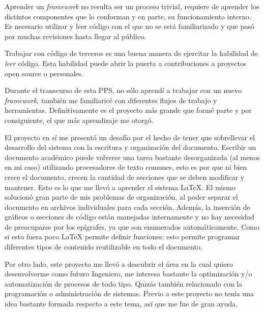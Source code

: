 Aprender un \textit{framework} no resulta ser un proceso trivial, requiere de aprender los
distintos componentes que lo conforman y en parte, su funcionamiento interno\@. Es necesario
utilizar y leer código con el que no se está familiarizado y que pasó por muchas revisiones
hasta llegar al público.

Trabajar con código de terceros es una buena manera de ejercitar la habilidad de \textit{leer}
código\@. Esta habilidad puede abrir la puerta a contribuciones a proyectos open source o
personales.

Durante el transcurso de esta PPS, no sólo aprendí a trabajar con un nuevo \textit{framework},
también me familiaricé con diferentes flujos de trabajo y herramientas\@. Definitivamente es
el proyecto más grande que formé parte y por consiguiente, el que más aprendizaje me otorgó.

El proyecto en sí me presentó un desafío por el hecho de tener que sobrellevar el desarrollo
del sistema con la escritura y organización del documento\@. Escribir un documento académico
puede volverse una tarea bastante desorganizada (al menos en mi caso) utilizando procesadores
de texto comunes, esto es por que ni bien crece el documento, crecen la cantidad de secciones
que se deben modificar y mantener\@. Esto es lo que me llevó a aprender el sistema {\LaTeX}\@.
El mismo solucionó gran parte de mis problemas de organización, al poder
separar el documento en archivos individuales para cada sección\@. Además, la inserción de
gráficos o secciones de código están manejadas internamente y no hay necesidad de
preocuparse por los
epígrafes, ya que son enumerados automáticamente\@. Como si esto fuera poco {\LaTeX} permite
definir funciones: esto permite programar diferentes tipos de contenido reutilizable en todo el
documento.


Por otro lado, este proyecto me llevó a descubrir el área en la cual quiero desenvolverme como
futuro Ingeniero, me interesa bastante la optimización y/o automatización de procesos de todo
tipo. Quizás también relacionado con la programación o administración de sistemas\@. Previo a
este proyecto no tenía una idea bastante formada respecto a este tema, así que me fue de gran
ayuda.
